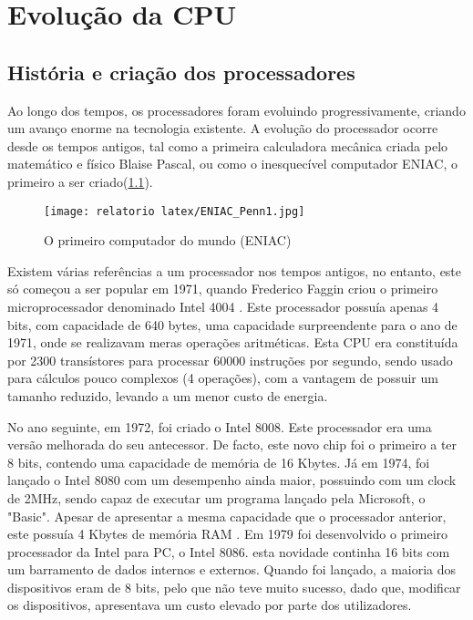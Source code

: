 \documentclass{report}
\begin{document}
\chapter{Evolução da CPU}
\label{chap.Evolução da CPU}
\section{História e criação dos processadores}

Ao longo dos tempos, os processadores foram evoluindo progressivamente, criando um avanço enorme na tecnologia existente. A evolução do processador ocorre desde os tempos antigos, tal como a primeira calculadora mecânica criada pelo matemático e físico Blaise Pascal, ou como o inesquecível computador \ac{ENIAC}, o primeiro a ser criado\cite{Historia1}(\ref{fig:ENIAC}). 


\begin{figure}[h!]
\centering
  \texttt{[image: relatorio latex/ENIAC\_Penn1.jpg]}
  \caption{O primeiro computador do mundo (\ac{ENIAC})}
  \label{fig:ENIAC}
\end{figure}

Existem várias referências a um processador nos tempos antigos, no entanto, este só começou a ser popular em 1971, quando Frederico Faggin criou o primeiro microprocessador denominado \ac{Intel} 4004 \cite{IntelH}. Este processador possuía apenas 4 bits, com capacidade de 640 bytes, uma capacidade surpreendente para o ano de 1971, onde se realizavam meras operações aritméticas. Esta \ac{CPU} era constituída por 2300 transístores para processar 60000 instruções por segundo, sendo usado para cálculos pouco complexos (4 operações), com a vantagem de possuir um tamanho reduzido, levando a um menor custo de energia\cite{Historia1}.

No ano seguinte, em 1972, foi criado o \ac{Intel} 8008. Este processador era uma versão melhorada do seu antecessor\cite{IntelH}. De facto, este novo chip foi o primeiro a ter 8 bits, contendo uma capacidade de memória de 16 Kbytes.
Já em 1974, foi lançado o \ac{Intel} 8080 com um desempenho ainda maior, possuindo com um clock de 2MHz, sendo capaz de executar um programa lançado pela Microsoft, o "Basic". Apesar de apresentar a mesma capacidade que o processador anterior, este possuía 4 Kbytes de memória \ac{RAM}\cite{Historia1} . 
Em 1979 foi desenvolvido o primeiro processador da \ac{Intel} para \ac{PC}, o \ac{Intel} 8086. esta novidade continha 16 bits com um barramento de dados internos e externos. Quando foi lançado, a maioria dos dispositivos eram de 8 bits, pelo que não teve muito sucesso, dado que, modificar os dispositivos, apresentava um custo elevado por parte dos utilizadores\cite{Historia1}.
\end{document}
